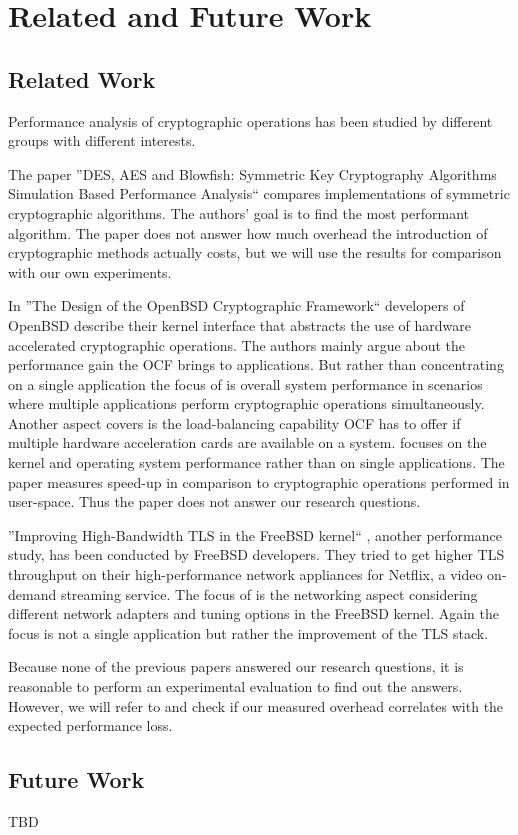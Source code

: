 \chapter{Related and Future Work}

\section{Related Work}\label{relatedwork}

Performance analysis of cryptographic operations has been studied by different groups with different interests.

The paper ''DES, AES and Blowfish: Symmetric Key Cryptography Algorithms Simulation Based Performance Analysis`` \cite{thakur2011aes} compares implementations of symmetric cryptographic algorithms.
The authors' goal is to find the most performant algorithm.
The paper does not answer how much overhead the introduction of cryptographic methods actually costs, but we will use the results for comparison with our own experiments.

In ''The Design of the OpenBSD Cryptographic Framework`` \cite{ocf} developers of OpenBSD describe their kernel interface that abstracts the use of hardware accelerated cryptographic operations.
The authors mainly argue about the performance gain the OCF brings to applications.
But rather than concentrating on a single application the focus of \cite{ocf} is overall system performance in scenarios where multiple applications perform cryptographic operations simultaneously.
Another aspect \cite{ocf} covers is the load-balancing capability OCF has to offer if multiple hardware acceleration cards are available on a system.
\cite{ocf} focuses on the kernel and operating system performance rather than on single applications.
The paper measures speed-up in comparison to cryptographic operations performed in user-space.
Thus the paper does not answer our research questions.

''Improving High-Bandwidth TLS in the FreeBSD kernel`` \cite{freebsdtls}, another performance study, has been conducted by FreeBSD developers.
They tried to get higher TLS throughput on their high-performance network appliances for Netflix, a video on-demand streaming service.
The focus of \cite{freebsdtls} is the networking aspect considering different network adapters and tuning options in the FreeBSD kernel.
Again the focus is not a single application but rather the improvement of the TLS stack.

Because none of the previous papers answered our research questions, it is reasonable to perform an experimental evaluation to find out the answers.
However, we will refer to \cite{thakur2011aes} and check if our measured overhead correlates with the expected performance loss.

\section{Future Work}

TBD